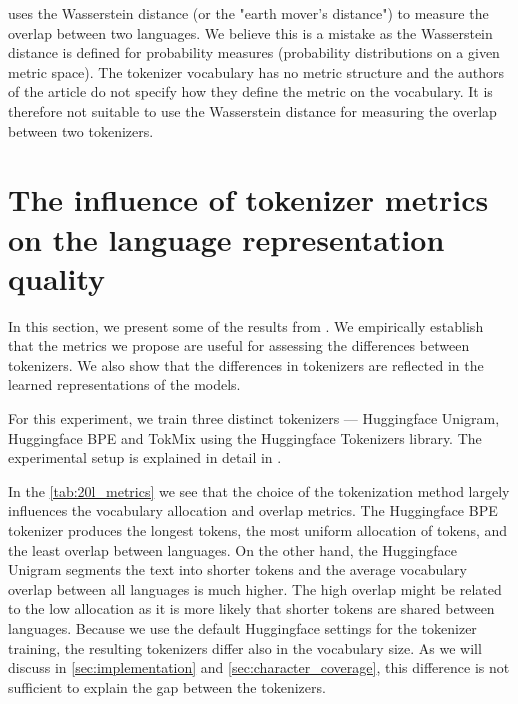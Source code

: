 \citet{chung_improving_2020} uses the Wasserstein distance (or the "earth mover's distance") to measure the overlap between two languages. We believe this is a mistake as the Wasserstein distance is defined for probability measures (probability distributions on a given metric space). The tokenizer vocabulary has no metric structure and the authors of the article do not specify how they define the metric on the vocabulary. It is therefore not suitable to use the Wasserstein distance for measuring the overlap between two tokenizers.


\section{The influence of tokenizer metrics on the language representation quality}
\label{sec:influence_of_metrics}

In this section, we present some of the results from \citet{limisiewicz_tokenization_2023}. We empirically establish that the metrics we propose are useful for assessing the differences between tokenizers. We also show that the differences in tokenizers are reflected in the learned representations of the models. 

For this experiment, we train three distinct tokenizers --- Huggingface Unigram, Huggingface BPE and TokMix using the Huggingface Tokenizers library. The experimental setup is explained in detail in .



In the \autoref{tab:20l_metrics} we see that the choice of the tokenization method largely influences the vocabulary allocation and overlap metrics. The Huggingface BPE tokenizer produces the longest tokens, the most uniform allocation of tokens, and the least overlap between languages. On the other hand, the Huggingface Unigram segments the text into shorter tokens and the average vocabulary overlap between all languages is much higher. The high overlap might be related to the low allocation as it is more likely that shorter tokens are shared between languages. Because we use the default Huggingface settings for the tokenizer training, the resulting tokenizers differ also in the vocabulary size.
 As we will discuss in \autoref{sec:implementation} and \autoref{sec:character_coverage}, this difference is not sufficient to explain the gap between the tokenizers. %

